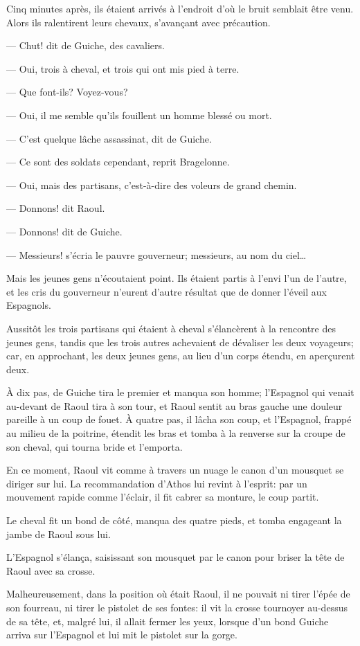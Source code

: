 Cinq minutes après, ils étaient arrivés à l'endroit d'où le bruit semblait être venu. Alors ils ralentirent leurs chevaux, s'avançant avec précaution.

— Chut! dit de Guiche, des cavaliers.

— Oui, trois à cheval, et trois qui ont mis pied à terre.

— Que font-ils? Voyez-vous?

— Oui, il me semble qu'ils fouillent un homme blessé ou mort.

— C'est quelque lâche assassinat, dit de Guiche.

— Ce sont des soldats cependant, reprit Bragelonne.

— Oui, mais des partisans, c'est-à-dire des voleurs de grand chemin.

— Donnons! dit Raoul.

— Donnons! dit de Guiche.

— Messieurs! s'écria le pauvre gouverneur; messieurs, au nom du ciel\dots

Mais les jeunes gens n'écoutaient point. Ils étaient partis à l'envi l'un de l'autre, et les cris du gouverneur n'eurent d'autre résultat que de donner l'éveil aux Espagnols.

Aussitôt les trois partisans qui étaient à cheval s'élancèrent à la rencontre des jeunes gens, tandis que les trois autres achevaient de dévaliser les deux voyageurs; car, en approchant, les deux jeunes gens, au lieu d'un corps étendu, en aperçurent deux.

À dix pas, de Guiche tira le premier et manqua son homme; l'Espagnol qui venait au-devant de Raoul tira à son tour, et Raoul sentit au bras gauche une douleur pareille à un coup de fouet. À quatre pas, il lâcha son coup, et l'Espagnol, frappé au milieu de la poitrine, étendit les bras et tomba à la renverse sur la croupe de son cheval, qui tourna bride et l'emporta.

En ce moment, Raoul vit comme à travers un nuage le canon d'un mousquet se diriger sur lui. La recommandation d'Athos lui revint à l'esprit: par un mouvement rapide comme l'éclair, il fit cabrer sa monture, le coup partit.

Le cheval fit un bond de côté, manqua des quatre pieds, et tomba engageant la jambe de Raoul sous lui.

L'Espagnol s'élança, saisissant son mousquet par le canon pour briser la tête de Raoul avec sa crosse.

Malheureusement, dans la position où était Raoul, il ne pouvait ni tirer l'épée de son fourreau, ni tirer le pistolet de ses fontes: il vit la crosse tournoyer au-dessus de sa tête, et, malgré lui, il allait fermer les yeux, lorsque d'un bond Guiche arriva sur l'Espagnol et lui mit le pistolet sur la gorge.


